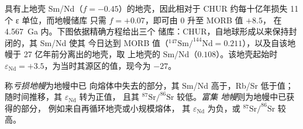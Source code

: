 具有上地壳 Sm/Nd（$f = -0.45$）的地壳，因此相对于 CHUR
约每十亿年损失 11 个 ε 单位，而地幔储库
只需 $f = +0.07$，即可由 0 升至 MORB 值 $+8.5$，
在 \qty{4.567}{Ga} 内。下图依据精确方程给出三个
储库：CHUR，自地球形成以来保持封闭的，其 Sm/Nd 使其
今日达到 MORB 值（$^{147}\mathrm{Sm}/^{144}\mathrm{Nd} =
0.211$），以及自该地幔于 27 亿年前分离出的地壳，取
上地壳的 Sm/Nd（$0.108$）。该地壳起始时 $\varepsilon_{\mathrm{Nd}} =
+3.5$，为当时其源区的值，现今为 $-27$。

\begin{definition}\label{def:b2:isotope-geochemistry:reservoirs}
称\emph{亏损地幔}为地幔中已
向熔体中失去的部分，其 Sm/Nd 高于，Rb/Sr
低于值；随时间推移，其 $\varepsilon_{\mathrm{Nd}}$ 转为正值，
且其 $^{87}\mathrm{Sr}/^{86}\mathrm{Sr}$ 较低。\emph{富集
地幔}则为地幔中已获得的部分，
例如来自再循环地壳或小规模熔体，
其 $\varepsilon_{\mathrm{Nd}}$ 为负，或 $^{87}\mathrm{Sr}/^{86}\mathrm{Sr}$ 较高。
\end{definition}

